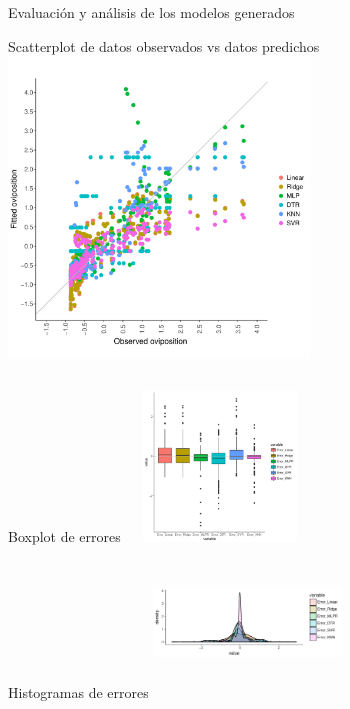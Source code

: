 \documentclass[10pt]{beamer}
\begin{document}
\begin{frame}{Evaluación y análisis de los modelos generados}
  \begin{center}
    Scatterplot de datos observados vs datos predichos
    \includegraphics[width=0.6\textwidth]{scatterplot}
  \end{center}
\end{frame}

\begin{frame}
  \begin{columns}[t]
  \centering
  Boxplot de errores
  \includegraphics[width=5cm,height=4cm]{boxplot_error}\\
  \centering
  Histogramas de errores
  \includegraphics[width=5cm,height=4cm]{histogram_error}
  \end{columns}

\end{frame}
\end{document}
